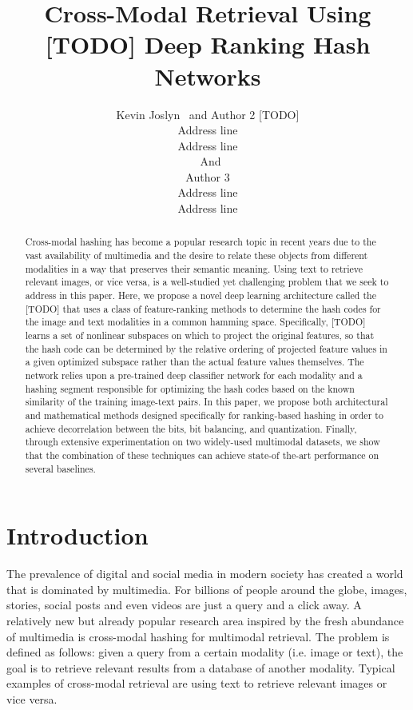 \documentclass[letterpaper]{article}
\begin{document}
\title{Cross-Modal Retrieval Using [TODO] Deep Ranking Hash Networks}
\author{Kevin Joslyn \ and Author 2 [TODO]\\
Address line\\
Address line\\
\ And\\
Author 3\\
Address line\\
Address line
}
%

\maketitle

\begin{abstract}
	
Cross-modal hashing has become a popular research topic in recent years due to the vast availability of multimedia and the desire to relate these objects from different modalities in a way that preserves their semantic meaning. Using text to retrieve relevant images, or vice versa, is a well-studied yet challenging problem that we seek to address in this paper. Here, we propose a novel deep learning architecture called the [TODO] that uses a class of feature-ranking methods to determine the hash codes for the image and text modalities in a common hamming space. Specifically, [TODO] learns a set of nonlinear subspaces on which to project the original features, so that the hash code can be determined by the relative ordering of projected feature values in a given optimized subspace rather than the actual feature values themselves.  The network relies upon a pre-trained deep classifier network for each modality and a hashing segment responsible for optimizing the hash codes based on the known similarity of the training image-text pairs. In this paper, we propose both architectural and mathematical methods designed specifically for ranking-based hashing in order to achieve decorrelation between the bits, bit balancing, and quantization. Finally, through extensive experimentation on two widely-used multimodal datasets, we show that the combination of these techniques can achieve state-of the-art performance on several baselines.
	
\end{abstract}

\section{Introduction}

The prevalence of digital and social media in modern society has created a world that is dominated by multimedia. For billions of people around the globe, images, stories, social posts and even videos are just a query and a click away. A relatively new but already popular research area inspired by the fresh abundance of multimedia is cross-modal hashing for multimodal retrieval. The problem is defined as follows: given a query from a certain modality (i.e. image or text), the goal is to retrieve relevant results from a database of another modality. Typical examples of cross-modal retrieval are using text to retrieve relevant images or vice versa.
\end{document}
